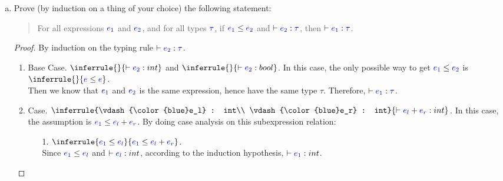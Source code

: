 \documentclass{article}
\newcommand{\meta}[1]{{\color{blue}#1}}
\begin{document}
\begin{enumerate}[leftmargin=*,itemindent=*,start=6,label={{\bf Problem \arabic*}.},ref=\arabic*]
\begin{enumerate}[(a)]
  \item \label{subexppf}Prove (by induction on a thing of your choice) the following statement:
    \begin{quote}
      For all expressions $\meta{e_1}$ and $\meta{e_2}$, and for all types $\meta{\tau}$,
      if $\meta{e_1} \le \meta{e_2}$ and $\vdash \meta{e_2} : \meta{\tau}$,
      then $\vdash \meta{e_1} : \meta{\tau}$.
    \end{quote}

    \begin{proof}
      By induction on the typing rule $\vdash \meta{e_2} : \meta{\tau}$.
      \begin{enumerate}
        \item Base Case. $\inferrule{ }{\vdash \meta{e_2} : int}$ and $\inferrule{ }{\vdash \meta{e_2} : bool}$. In this case, the only possible way to get $\meta{e_1} \leq \meta{e_2}$ is $\inferrule{ }{\meta{e} \leq \meta{e}}$.\\
        Then we know that $\meta{e_1}$ and $\meta{e_2}$ is the same expression, hence have the same type $\tau$. Therefore, $\vdash \meta{e_1} : \meta{\tau}$.
        
        \item Case. $\inferrule{\vdash \meta{e_l} : int\\ \vdash \meta{e_r} : int}{\vdash \meta{e_l} + \meta{e_r} : int}$. In this case, the assumption is $\meta{e_1} \leq \meta{e_l} + \meta{e_r}$. By doing case analysis on this subexpression relation:
          \begin{itemize}
            \item [1.] $\inferrule{\meta{e_1} \leq \meta{e_l}}{\meta{e_1} \leq \meta{e_l} + \meta{e_r}}$. \\
            Since $\meta{e_1} \leq \meta{e_l}$ and $\vdash \meta{e_l} : int$, according to the induction hypothesis, $\vdash \meta{e_1} : int$.
            

\end{itemize}
\end{enumerate}
\end{proof}
\end{enumerate}
\end{enumerate}
\end{document}
